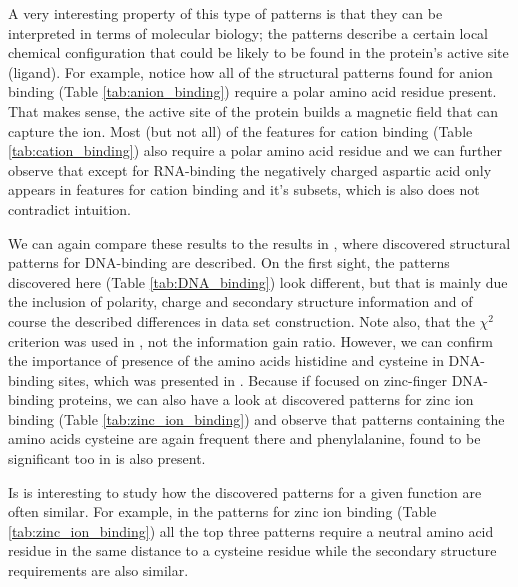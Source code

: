 \documentclass[11pt,twoside,a4paper]{book}
\begin{document}
A very interesting property of this type of patterns is that they can
be interpreted in terms of molecular biology;
the patterns describe a certain local chemical configuration that could
be likely to be found in the protein's active site (ligand).
For example, notice how all of the structural patterns found for anion binding (Table \ref{tab:anion_binding})
require a polar amino acid residue present. 
That makes sense, the active site of the protein builds a magnetic field that can capture the ion.
Most (but not all) of the features for cation binding (Table \ref{tab:cation_binding})
also require a polar amino acid residue and we can further observe that except for RNA-binding the negatively charged
aspartic acid only appears in features for cation binding and it's subsets,
which is also does not contradict intuition. 

We can again compare these results to the results in \cite{szabova},
where discovered structural patterns for DNA-binding are described.
On the first sight, the patterns discovered here (Table \ref{tab:DNA_binding}) look different,
but that is mainly due the inclusion of polarity, charge and secondary structure information
and of course the described differences in data set construction.
Note also,  that the $\chi^2$ criterion was used in \cite{szabova}, not the information gain ratio.
However, we can confirm the importance of presence of the amino acids histidine
and cysteine in DNA-binding sites, which was presented in \cite{szabova}.
Because if focused on zinc-finger DNA-binding proteins, 
we can also have a look at discovered patterns for zinc ion binding (Table \ref{tab:zinc_ion_binding})
and observe that patterns containing the amino acids cysteine are again frequent there and phenylalanine,
found to be significant too in \cite{szabova} is also present.

Is is interesting to study how the discovered patterns for a given function
are often similar.
For example, in the patterns for zinc ion binding (Table \ref{tab:zinc_ion_binding}) all the top three patterns require a neutral amino acid residue
in the same distance to a cysteine residue while the secondary structure requirements are also similar.
\end{document}
